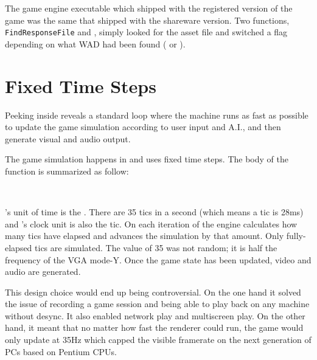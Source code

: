 \par
\vspace{-10pt}
The game engine executable which shipped with the registered version of the game was the same that shipped with the shareware version. Two functions, \texttt{\justify FindResponseFile} and , simply looked for the asset file and switched a flag depending on what WAD had been found ( or ).




\section{Fixed Time Steps}
Peeking inside  reveals a standard loop where the machine runs as fast as possible to update the game simulation according to user input and A.I., and then generate visual and audio output.\\
\par
{}
The game simulation happens in  and uses fixed time steps. The body of the function is summarized as follow:\\
\par
{}\label{TryRunTics.c}\\
\par
\doom's unit of time is the . There are 35 tics in a second (which means a tic is 28ms) and 
's clock unit is also the tic. On each iteration of  the engine calculates how many tics have elapsed and advances the simulation by that amount. Only fully-elapsed tics are simulated. The value of 35 was not random; it is half the frequency of the VGA mode-Y. Once the game state has been updated, video and audio are generated.\\
\par
{}
\par
This design choice would end up being controversial. On the one hand it solved the issue of recording a game session and being able to play back on any machine without desync. It also enabled network play and multiscreen play. On the other hand, it meant that no matter how fast the renderer could run, the game would only update at 35Hz which capped the visible framerate on the next generation of PCs based on Pentium CPUs.\\
\par



